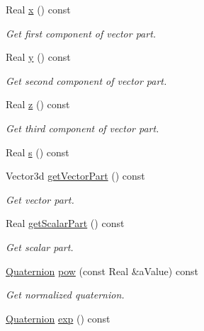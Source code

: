 \begin{DoxyCompactItemize}
Real \hyperlink{classlibrary_1_1math_1_1geom_1_1trf_1_1rot_1_1_quaternion_abd664a9792b2e039a980e77b861f74dd}{x} () const
\begin{DoxyCompactList}\small\item\em Get first component of vector part. \end{DoxyCompactList}\item 
Real \hyperlink{classlibrary_1_1math_1_1geom_1_1trf_1_1rot_1_1_quaternion_a5bbbf13da75dd8b89fb1a18326f8d2d1}{y} () const
\begin{DoxyCompactList}\small\item\em Get second component of vector part. \end{DoxyCompactList}\item 
Real \hyperlink{classlibrary_1_1math_1_1geom_1_1trf_1_1rot_1_1_quaternion_aaf9021e33aad157bf1444485fb486513}{z} () const
\begin{DoxyCompactList}\small\item\em Get third component of vector part. \end{DoxyCompactList}\item 
Real \hyperlink{classlibrary_1_1math_1_1geom_1_1trf_1_1rot_1_1_quaternion_a7b5045b46500d4f20e98ff29a9ed4c88}{s} () const
\item 
Vector3d \hyperlink{classlibrary_1_1math_1_1geom_1_1trf_1_1rot_1_1_quaternion_a3f51bfc8976d79f8d4efb7d32d5a422b}{get\+Vector\+Part} () const
\begin{DoxyCompactList}\small\item\em Get vector part. \end{DoxyCompactList}\item 
Real \hyperlink{classlibrary_1_1math_1_1geom_1_1trf_1_1rot_1_1_quaternion_ac9560aa15c9c4682dd571983bf3f4ab6}{get\+Scalar\+Part} () const
\begin{DoxyCompactList}\small\item\em Get scalar part. \end{DoxyCompactList}\item 
\hyperlink{classlibrary_1_1math_1_1geom_1_1trf_1_1rot_1_1_quaternion}{Quaternion} \hyperlink{classlibrary_1_1math_1_1geom_1_1trf_1_1rot_1_1_quaternion_a1de9e1824ffdbca766d51a984fd2e2ed}{pow} (const Real \&a\+Value) const
\begin{DoxyCompactList}\small\item\em Get normalized quaternion. \end{DoxyCompactList}\item 
\hyperlink{classlibrary_1_1math_1_1geom_1_1trf_1_1rot_1_1_quaternion}{Quaternion} \hyperlink{classlibrary_1_1math_1_1geom_1_1trf_1_1rot_1_1_quaternion_a171373818023a1c013891d4297360542}{exp} () const

\end{DoxyCompactItemize}
